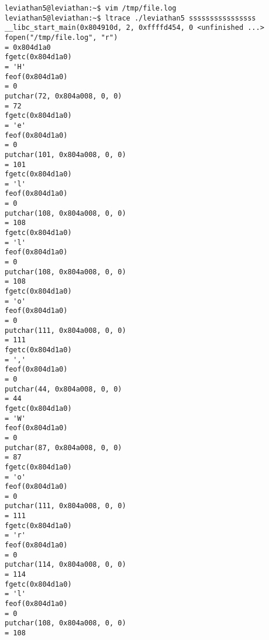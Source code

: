 \documentclass[11pt]{article}
\begin{document}
\begin{lstlisting}
leviathan5@leviathan:~$ vim /tmp/file.log
leviathan5@leviathan:~$ ltrace ./leviathan5 ssssssssssssssss
__libc_start_main(0x804910d, 2, 0xffffd454, 0 <unfinished ...>
fopen("/tmp/file.log", "r")                                              = 0x804d1a0
fgetc(0x804d1a0)                                                         = 'H'
feof(0x804d1a0)                                                          = 0
putchar(72, 0x804a008, 0, 0)                                             = 72
fgetc(0x804d1a0)                                                         = 'e'
feof(0x804d1a0)                                                          = 0
putchar(101, 0x804a008, 0, 0)                                            = 101
fgetc(0x804d1a0)                                                         = 'l'
feof(0x804d1a0)                                                          = 0
putchar(108, 0x804a008, 0, 0)                                            = 108
fgetc(0x804d1a0)                                                         = 'l'
feof(0x804d1a0)                                                          = 0
putchar(108, 0x804a008, 0, 0)                                            = 108
fgetc(0x804d1a0)                                                         = 'o'
feof(0x804d1a0)                                                          = 0
putchar(111, 0x804a008, 0, 0)                                            = 111
fgetc(0x804d1a0)                                                         = ','
feof(0x804d1a0)                                                          = 0
putchar(44, 0x804a008, 0, 0)                                             = 44
fgetc(0x804d1a0)                                                         = 'W'
feof(0x804d1a0)                                                          = 0
putchar(87, 0x804a008, 0, 0)                                             = 87
fgetc(0x804d1a0)                                                         = 'o'
feof(0x804d1a0)                                                          = 0
putchar(111, 0x804a008, 0, 0)                                            = 111
fgetc(0x804d1a0)                                                         = 'r'
feof(0x804d1a0)                                                          = 0
putchar(114, 0x804a008, 0, 0)                                            = 114
fgetc(0x804d1a0)                                                         = 'l'
feof(0x804d1a0)                                                          = 0
putchar(108, 0x804a008, 0, 0)                                            = 108

\end{lstlisting}
\end{document}
